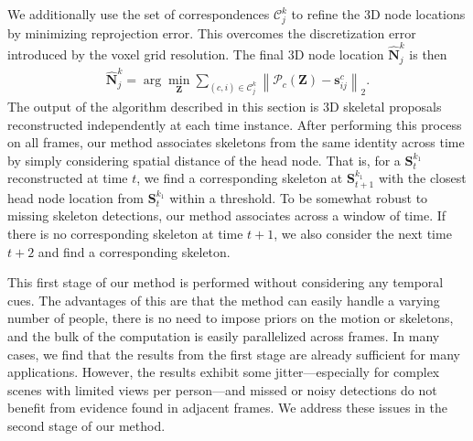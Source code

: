 We additionally use the set of correspondences $\mathcal{C}_j^k$ to refine the 3D node locations by minimizing reprojection error. This overcomes the discretization error introduced by the voxel grid resolution. The final 3D node location $\hat{\mathbf{N}}^{k}_{j}$ is then
\begin{gather}
\hat{\mathbf{N}}^k_j = \arg\min_\mathbf{Z} \sum_{(c,i) \in \mathcal{C}_j^k} \left\|\mathcal{P}_c(\mathbf{Z}) - \mathbf{s}_{ij}^c \right\|_2. \nonumber
\end{gather}
The output of the algorithm described in this section is 3D skeletal proposals reconstructed independently at each time instance. After performing this process on all frames, our method associates skeletons from the same identity across time by simply considering spatial distance of the head node. That is, for a $\mathbf{S}_t^{k_1}$ reconstructed at time $t$, we find a corresponding skeleton at $\mathbf{S}_{t+1}^{k_1}$ with the closest head node location from $\mathbf{S}_t^{k_1}$ within a threshold. 
To be somewhat robust to missing skeleton detections, our method associates across a window of time. If there is no corresponding skeleton at time $t+1$, we also consider the next time $t+2$ and find a corresponding skeleton.

This first stage of our method is performed without considering any temporal cues. The advantages of this are that the method can easily handle a varying number of people, there is no need to impose priors on the motion or skeletons, and the bulk of the computation is easily parallelized across frames. In many cases, we find that the results from the first stage are already sufficient for many applications. However, the results exhibit some jitter---especially for complex scenes with limited views per person---and missed or noisy detections do not benefit from evidence found in adjacent frames. We address these issues in the second stage of our method.

